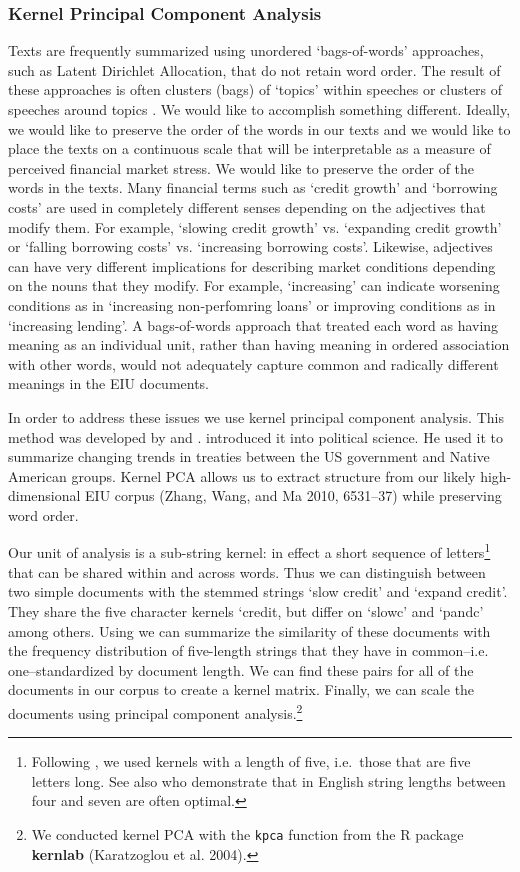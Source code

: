 \documentclass[]{article}
\begin{document}
\subsubsection{Kernel Principal Component
Analysis}\label{kernel-principal-component-analysis}

Texts are frequently summarized using unordered `bags-of-words'
approaches, such as Latent Dirichlet Allocation, that do not retain word order. The result of these approaches is often clusters (bags) of `topics' within speeches or clusters of speeches around topics \citep[for a review see][]{Grimmer2013}. We would like to accomplish something different. Ideally,
we would like to preserve the order of the words in our texts and we would like to place the texts on a continuous scale that will be interpretable as a measure of perceived financial market stress. We would like to preserve the order of the words in the texts. Many financial terms such as `credit growth' and `borrowing costs' are used in completely different senses depending on the adjectives that modify them. For example, `slowing credit growth' vs. `expanding credit growth'
or `falling borrowing costs' vs. `increasing borrowing costs'. Likewise, adjectives can have very different implications for describing market conditions depending on the nouns that they modify. For example, `increasing' can indicate worsening conditions as in `increasing non-perfomring loans' or improving conditions as in `increasing lending'.  A
bags-of-words approach that treated each word as having meaning as an individual unit, rather than having meaning in ordered association with other words, would not adequately capture common and radically different meanings in the EIU documents.

In order to address these issues we use kernel principal component
analysis. This method was developed by \cite{Scholkopf1998} and \cite{lodhi2002}. \cite{Spirling2012} introduced it into political science. He used it to summarize changing
  trends in treaties between the US government and Native American
  groups. Kernel PCA allows us to extract structure from our likely
high-dimensional EIU corpus (Zhang, Wang, and Ma 2010, 6531--37) while
preserving word order.

Our unit of analysis is a sub-string kernel: in
effect a short sequence of letters\footnote{Following \cite{Spirling2012},
  we used kernels with a length of five, i.e.~those that are five letters
  long. See also \cite{lodhi2002} who demonstrate that in English
  string lengths between four and seven are often optimal.} that can be
shared within and across words. Thus we can distinguish between two
simple documents with the stemmed strings `slow credit' and `expand
credit'. They share the five character kernels `credit, but differ on
`slowc' and `pandc' among others. Using \cite{lodhi2002} we can
summarize the similarity of these documents with the frequency
distribution of five-length strings that they have in
common--i.e. one--standardized by document length. We can find these pairs
for all of the documents in our corpus to create a kernel matrix.
Finally, we can scale the documents using principal component
analysis.\footnote{We conducted kernel PCA with the \texttt{kpca}
  function from the R package \textbf{kernlab} (Karatzoglou et al.
  2004).}
\end{document}
